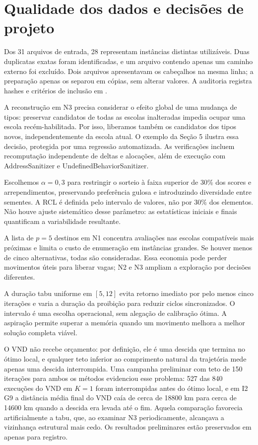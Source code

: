 \documentclass[12pt]{article}
\begin{document}
\section{Qualidade dos dados e decisões de projeto}
Dos 31 arquivos de entrada, 28 representam instâncias distintas utilizáveis. Duas duplicatas exatas foram identificadas, e um arquivo contendo apenas um caminho externo foi excluído. Dois arquivos apresentavam os cabeçalhos na mesma linha; a preparação apenas os separou em cópias, sem alterar valores. A auditoria registra hashes e critérios de inclusão em .

A reconstrução em N3 precisa considerar o efeito global de uma mudança de tipos: preservar candidatos de todas as escolas inalteradas impedia ocupar uma escola recém-habilitada. Por isso, liberamos também os candidatos dos tipos novos, independentemente da escola atual. O exemplo da Seção 5 ilustra essa decisão, protegida por uma regressão automatizada. As verificações incluem recomputação independente de deltas e alocações, além de execução com AddressSanitizer e UndefinedBehaviorSanitizer.

Escolhemos $\alpha=0{,}3$ para restringir o sorteio à faixa superior de 30\% dos scores e arrependimentos, preservando preferência gulosa e introduzindo diversidade entre sementes. A RCL é definida pelo intervalo de valores, não por 30\% dos elementos. Não houve ajuste sistemático desse parâmetro: as estatísticas iniciais e finais quantificam a variabilidade resultante.

A lista de $p=5$ destinos em N1 concentra avaliações nas escolas compatíveis mais próximas e limita o custo de enumeração em instâncias grandes. Se houver menos de cinco alternativas, todas são consideradas. Essa economia pode perder movimentos úteis para liberar vagas; N2 e N3 ampliam a exploração por decisões diferentes.

A duração tabu uniforme em $[5,12]$ evita retorno imediato por pelo menos cinco iterações e varia a duração da proibição para reduzir ciclos sincronizados. O intervalo é uma escolha operacional, sem alegação de calibração ótima. A aspiração permite superar a memória quando um movimento melhora a melhor solução completa viável.

O VND não recebe orçamento: por definição, ele é uma descida que termina no ótimo local, e qualquer teto inferior ao comprimento natural da trajetória mede apenas uma descida interrompida. Uma campanha preliminar com teto de 150 iterações para ambos os métodos evidenciou esse problema: 527 das 840 execuções do VND em $K=1$ foram interrompidas antes do ótimo local, e em I2 G9 a distância média final do VND caía de cerca de 18800 km para cerca de 14600 km quando a descida era levada até o fim. Aquela comparação favorecia artificialmente a tabu, que, ao examinar N3 periodicamente, alcançava a vizinhança estrutural mais cedo. Os resultados preliminares estão preservados em  apenas para registro.
\end{document}
